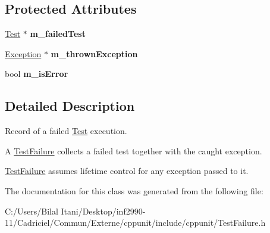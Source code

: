 \subsection*{Protected Attributes}
\begin{DoxyCompactItemize}
\item 
\hyperlink{class_test}{Test} $\ast$ {\bfseries m\+\_\+failed\+Test}\hypertarget{class_test_failure_a2ba79089909967b45aedc4992b51553a}{}\label{class_test_failure_a2ba79089909967b45aedc4992b51553a}

\item 
\hyperlink{class_exception}{Exception} $\ast$ {\bfseries m\+\_\+thrown\+Exception}\hypertarget{class_test_failure_a96bfae3c1f32d0c1729501d68016f431}{}\label{class_test_failure_a96bfae3c1f32d0c1729501d68016f431}

\item 
bool {\bfseries m\+\_\+is\+Error}\hypertarget{class_test_failure_abf258e5bec289b51fb13147a62b8b75d}{}\label{class_test_failure_abf258e5bec289b51fb13147a62b8b75d}

\end{DoxyCompactItemize}


\subsection{Detailed Description}
Record of a failed \hyperlink{class_test}{Test} execution.

A \hyperlink{class_test_failure}{Test\+Failure} collects a failed test together with the caught exception. 

\hyperlink{class_test_failure}{Test\+Failure} assumes lifetime control for any exception passed to it. 

The documentation for this class was generated from the following file\+:\begin{DoxyCompactItemize}
\item 
C\+:/\+Users/\+Bilal Itani/\+Desktop/inf2990-\/11/\+Cadriciel/\+Commun/\+Externe/cppunit/include/cppunit/Test\+Failure.\+h\end{DoxyCompactItemize}
